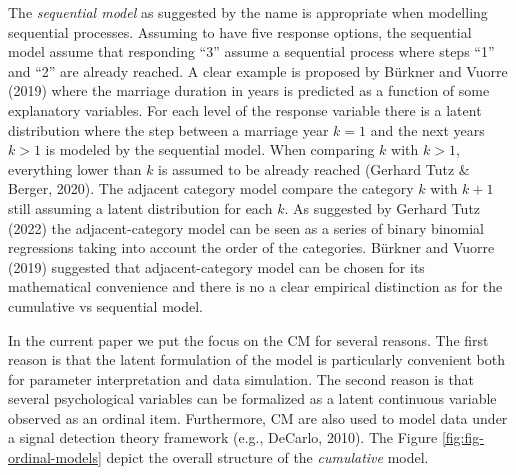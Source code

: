 \documentclass[
  man,floatsintext]{apa6}
\begin{document}
The \emph{sequential model} as suggested by the name is appropriate when modelling sequential processes. Assuming to have five response options, the sequential model assume that responding ``3'' assume a sequential process where steps ``1'' and ``2'' are already reached. A clear example is proposed by Bürkner and Vuorre (2019) where the marriage duration in years is predicted as a function of some explanatory variables. For each level of the response variable there is a latent distribution where the step between a marriage year \(k = 1\) and the next years \(k > 1\) is modeled by the sequential model. When comparing \(k\) with \(k > 1\), everything lower than \(k\) is assumed to be already reached (Gerhard Tutz \& Berger, 2020). The adjacent category model compare the category \(k\) with \(k + 1\) still assuming a latent distribution for each \(k\). As suggested by Gerhard Tutz (2022) the adjacent-category model can be seen as a series of binary binomial regressions taking into account the order of the categories. Bürkner and Vuorre (2019) suggested that adjacent-category model can be chosen for its mathematical convenience and there is no a clear empirical distinction as for the cumulative vs sequential model.

In the current paper we put the focus on the CM for several reasons. The first reason is that the latent formulation of the model is particularly convenient both for parameter interpretation and data simulation. The second reason is that several psychological variables can be formalized as a latent continuous variable observed as an ordinal item. Furthermore, CM are also used to model data under a signal detection theory framework (e.g., DeCarlo, 2010). The Figure \ref{fig:fig-ordinal-models} depict the overall structure of the \emph{cumulative} model.

\scriptsize
\end{document}
